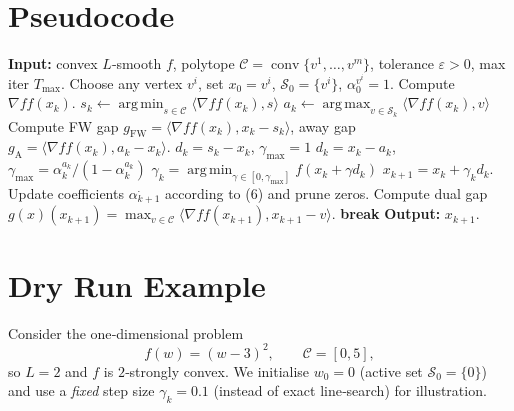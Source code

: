 \documentclass[11pt]{article}
\newcommand{\C}{\mathcal{C}}
\newcommand{\gap}{g(x)}
\newcommand{\grad}{\nabla f}
\newcommand{\argmin}{\operatorname*{arg\,min}}
\newcommand{\argmax}{\operatorname*{arg\,max}}
\begin{document}
\section*{Pseudocode}
\begin{algorithm}[H]
\caption{Away‑Step Frank–Wolfe (AFW)}
\begin{algorithmic}[1]
\State \textbf{Input:} convex $L$‑smooth $f$, polytope $\C=\operatorname{conv}\{v^{1},\dots ,v^{m}\}$, 
tolerance $\varepsilon>0$, max iter $T_{\max }$.
\State Choose any vertex $v^{i}$, set $x_{0}=v^{i}$, $\mathcal{S}_{0}=\{v^{i}\}$, $\alpha_{0}^{v^{i}}=1$.
    \State Compute $\grad f(x_{k})$.
    \State $s_{k}\gets\argmin_{s\in\C}\langle \grad f(x_{k}),s\rangle$ \hfill{}
    \State $a_{k}\gets\argmax_{v\in\mathcal{S}_{k}}\langle \grad f(x_{k}),v\rangle$ \hfill{}
    \State Compute FW gap $g_{\text{FW}}=\langle \grad f(x_{k}),x_{k}-s_{k}\rangle$,
          away gap $g_{\text{A}}=\langle \grad f(x_{k}),a_{k}-x_{k}\rangle$.
        \State $d_{k}=s_{k}-x_{k}$,\; $\gamma_{\max}=1$ 
    \Else
        \State $d_{k}=x_{k}-a_{k}$,\;
        $\gamma_{\max}= \alpha_{k}^{a_{k}}/(1-\alpha_{k}^{a_{k}})$ 
    \EndIf
    \State $\displaystyle\gamma_{k}= \argmin_{\gamma\in[0,\gamma_{\max}]}
            f(x_{k}+\gamma d_{k})$ 
    \State $x_{k+1}=x_{k}+ \gamma_{k}d_{k}$.
    \State Update coefficients $\alpha_{k+1}^{\cdot}$ according to (6) and prune zeros.
    \State Compute dual gap $\gap(x_{k+1})=
            \max_{v\in\C}\langle \grad f(x_{k+1}),x_{k+1}-v\rangle$.
    \If{$\gap(x_{k+1})\le\varepsilon$}
        \State \textbf{break}
    \EndIf
\EndFor
\State \textbf{Output:} $x_{k+1}$.
\end{algorithmic}
\end{algorithm}

\section*{Dry Run Example}
Consider the one‑dimensional problem
\[
f(w)=(w-3)^{2},\qquad \C=[0,5],
\]
so $L=2$ and $f$ is $2$‑strongly convex.
We initialise $w_{0}=0$ (active set $\mathcal{S}_{0}=\{0\}$) and use a \emph{fixed} step size 
$\gamma_{k}=0.1$ (instead of exact line‑search) for illustration.
\end{document}
